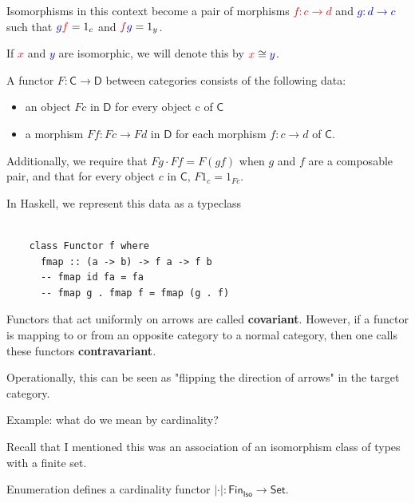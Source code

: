 \documentclass[tikz]{beamer}
\newcommand{\cat}[1]{\bm{ \mathsf{#1} }}
\newcommand{\cc}{\cat{C}}
\newcommand{\dd}{\cat{D}}
\newcommand{\red}[1]{\textcolor{red}{#1}}
\newcommand{\mred}[1]{\textcolor{red}{$#1$}}
\newcommand{\blue}[1]{\textcolor{blue}{#1}}
\newcommand{\mblue}[1]{\textcolor{blue}{$#1$}}
\theoremstyle{definition}
\begin{document}
\frame
{ 
	Isomorphisms in this context become a pair of morphisms \mred{ f : c \to d} and \mblue{g : d \to c} such that $\blue{g}\red{f} = 1_c$ and $\red{f}\blue{g} = 1_y$.
	
	 If \mred{x} and \mblue{y} are isomorphic, we will denote this by $\red{x} \cong \blue{y}$.
}

\frame
{
	
	\begin{definition}[Functor]
		A functor $F : \cc \to \dd$ between categories consists of the following data: 
		
		\begin{itemize}
			\item an object $Fc$ in $\dd$ for every object c of $\cc$
			\item a morphism $Ff : Fc \to Fd$ in $\dd$ for each morphism $f : c \to d$ of $\cc$.
		\end{itemize}
		
		Additionally, we require that $Fg \cdot Ff = F(gf)$ when $g$ and $f$ are a composable pair, and that for every object $c$ in $\cc$, $F1_c = 1_{Fc}$.
	\end{definition}
}

\begin{frame}[fragile]

In Haskell, we represent this data as a typeclass

	\begin{verbatim}
	
	class Functor f where
	  fmap :: (a -> b) -> f a -> f b
	  -- fmap id fa = fa 
	  -- fmap g . fmap f = fmap (g . f)
	\end{verbatim}
	
\end{frame}

\frame
{
	Functors that act uniformly on arrows are called \textbf{covariant}. However, if a functor is mapping to or from an opposite category to a normal category, then one calls these functors \textbf{contravariant}.
	
	 Operationally, this can be seen as "flipping the direction of arrows" in the target category. 
}


\frame
{
	Example: what do we mean by cardinality?
}

\frame
{
	Recall that I mentioned this was an association of an isomorphism class of types with a finite set. 
}

\frame
{
	Enumeration defines a cardinality functor $|\cdot|: \cat{Fin_{Iso}} \to \cat{Set}$.  
}
\end{document}
